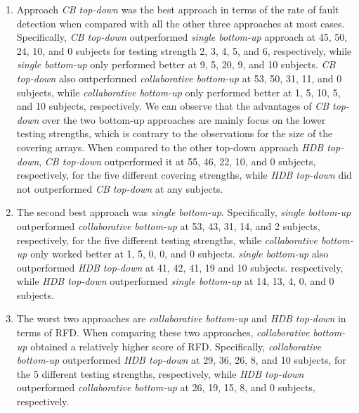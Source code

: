 \documentclass[conference]{IEEEtran}
\theoremstyle{definition}
\begin{document}
 \begin{enumerate}
 \item Approach \emph{CB top-down} was the best approach in terms of the rate of fault detection when compared with all the other three approaches at most cases. Specifically, \emph{CB top-down} outperformed \emph{single bottom-up} approach at 45, 50, 24, 10, and 0 subjects for testing strength 2, 3, 4, 5, and 6, respectively,  while \emph{single bottom-up} only performed better at 9, 5, 20, 9, and 10 subjects. \emph{CB top-down} also outperformed \emph{collaborative bottom-up} at 53, 50, 31, 11, and 0 subjects, while \emph{collaborative bottom-up} only performed better at 1, 5, 10, 5, and 10 subjects, respectively. We can observe that the advantages of \emph{CB top-down}  over the two bottom-up approaches are mainly focus on the lower testing strengths, which is contrary to the observations for the size of the covering arrays. When compared to the other top-down approach \emph{HDB top-down},  \emph{CB top-down} outperformed it at 55, 46, 22, 10, and 0 subjects, respectively, for the five different covering strengths, while \emph{HDB top-down} did not outperformed \emph{CB top-down} at any subjects.

 \item The second best approach was \emph{single bottom-up}. Specifically,  \emph{single bottom-up} outperformed \emph{collaborative bottom-up} at 53, 43, 31, 14, and 2 subjects, respectively, for the five different testing strengths, while \emph{collaborative bottom-up} only worked better at 1, 5, 0, 0, and 0 subjects.  \emph{single bottom-up} also outperformed \emph{HDB top-down} at 41, 42, 41, 19 and 10 subjects. respectively, while \emph{HDB top-down} outperformed \emph{single bottom-up} at 14, 13, 4, 0, and 0 subjects.

  \item The worst two approaches are \emph{collaborative bottom-up} and \emph{HDB top-down} in terms of RFD. When comparing these two approaches, \emph{collaborative bottom-up} obtained a relatively higher score of RFD. Specifically, \emph{collaborative bottom-up} outperformed \emph{HDB top-down} at 29, 36, 26, 8, and 10 subjects,  for the 5 different testing strengths, respectively, while \emph{HDB top-down} outperformed \emph{collaborative bottom-up} at 26, 19, 15, 8, and 0 subjects,  respectively.
\end{enumerate}
\end{document}
